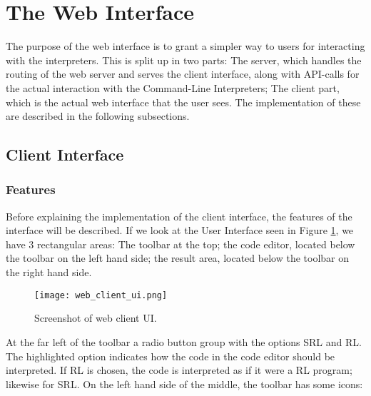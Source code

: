 
\section{The Web Interface}

The purpose of the web interface is to grant a simpler way to users for interacting with the interpreters.
This is split up in two parts:
The server, which handles the routing of the web server and serves the client interface, along with API-calls for the actual interaction with the Command-Line Interpreters;
The client part, which is the actual web interface that the user sees.
The implementation of these are described in the following subsections.

\subsection{Client Interface}
\label{sec:implementation_web_client}


\subsubsection{Features}

Before explaining the implementation of the client interface, the features of the interface will be described.
If we look at the User Interface seen in Figure \ref{fig:web_client_ui}, we have 3 rectangular areas: The toolbar at the top; the code editor, located below the toolbar on the left hand side; the result area, located below the toolbar on the right hand side.

\begin{figure}
  \texttt{[image: web\_client\_ui.png]}
  \caption{Screenshot of web client UI.}
  \label{fig:web_client_ui}
\end{figure}

At the far left of the toolbar a radio button group with the options SRL and RL. The highlighted option indicates how the code in the code editor should be interpreted. If RL is chosen, the code is interpreted as if it were a RL program; likewise for SRL.
On the left hand side of the middle, the toolbar has some icons:

